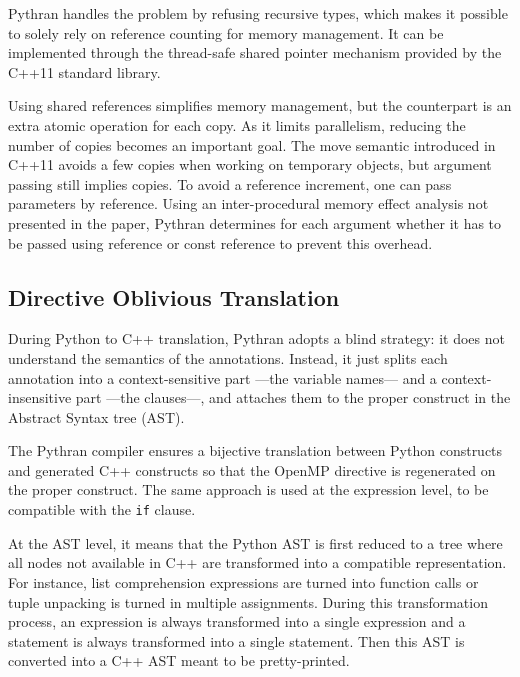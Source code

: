 \documentclass[conference]{IEEEtran}
\begin{document}
Pythran handles the problem by refusing recursive types, which makes it possible
to solely rely on reference counting for memory management. It can be
implemented through the thread-safe shared pointer mechanism provided by the
C++11 standard library.

Using shared references simplifies memory management, but the counterpart is an
extra atomic operation for each copy.
As it limits parallelism, reducing the number of copies becomes an important
goal.
The move semantic introduced in
C++11 avoids a few copies when working on temporary objects, but argument
passing still implies copies. To avoid a reference increment, one can pass
parameters by reference. Using an inter-procedural memory effect analysis not
presented in the paper, Pythran determines for each argument whether it has to
be passed using reference or const reference to prevent this overhead.

\subsection{Directive Oblivious Translation}

During Python to C++ translation, Pythran adopts a blind strategy: it does not
understand the semantics of the annotations. Instead, it just splits each
annotation into a context-sensitive part ---the variable names--- and a
context-insensitive part ---the clauses---, and attaches them to the proper
construct in the Abstract Syntax tree (AST).

The Pythran compiler ensures a bijective translation between Python constructs
and generated C++ constructs so that the OpenMP directive is regenerated on the
proper construct.
The same approach is used at the expression level, to be
compatible with the \texttt{if} clause.

At the AST level, it means that the Python AST is first reduced to a tree where
all nodes not available in C++ are transformed into a compatible representation.
For instance, list comprehension expressions are turned into function calls or
tuple unpacking is turned in multiple assignments. During this transformation
process, an expression is always transformed into a single expression and a
statement is always transformed into a single statement.
Then this AST is converted into a C++ AST meant to be pretty-printed.
\end{document}
